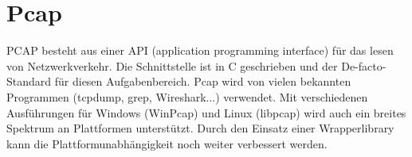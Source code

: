 \section{Pcap}
\label{sec:Pcap}

\acs{PCAP} besteht aus einer API (application programming interface) für das lesen von Netzwerkverkehr. Die Schnittstelle ist in C geschrieben und der De-facto-Standard für diesen Aufgabenbereich. Pcap wird von vielen bekannten Programmen (tcpdump, grep, Wireshark...) verwendet. Mit verschiedenen Ausführungen für Windows (WinPcap) und Linux (libpcap) wird auch ein breites Spektrum an Plattformen unterstützt. Durch den Einsatz einer Wrapperlibrary kann die Plattformunabhängigkeit noch weiter verbessert werden.